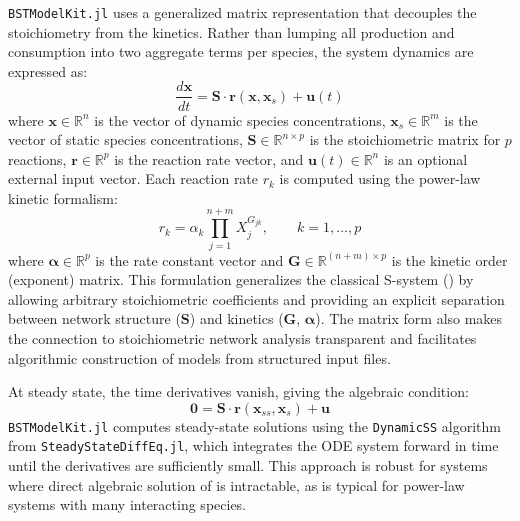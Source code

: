 \documentclass[11pt]{article}
\begin{document}
\texttt{BSTModelKit.jl} uses a generalized matrix representation that decouples the stoichiometry from the kinetics. Rather than lumping all production and consumption into two aggregate terms per species, the system dynamics are expressed as:
\begin{equation}\label{eq:matrix}
    \frac{d\mathbf{x}}{dt} = \mathbf{S} \cdot \mathbf{r}(\mathbf{x}, \mathbf{x}_s) + \mathbf{u}(t)
\end{equation}
where $\mathbf{x} \in \mathbb{R}^n$ is the vector of dynamic species concentrations, $\mathbf{x}_s \in \mathbb{R}^m$ is the vector of static species concentrations, $\mathbf{S} \in \mathbb{R}^{n \times p}$ is the stoichiometric matrix for $p$ reactions, $\mathbf{r} \in \mathbb{R}^p$ is the reaction rate vector, and $\mathbf{u}(t) \in \mathbb{R}^n$ is an optional external input vector. Each reaction rate $r_k$ is computed using the power-law kinetic formalism:
\begin{equation}\label{eq:powerlaw}
    r_k = \alpha_k \prod_{j=1}^{n+m} X_j^{G_{jk}}, \qquad k = 1, \dots, p
\end{equation}
where $\boldsymbol{\alpha} \in \mathbb{R}^p$ is the rate constant vector and $\mathbf{G} \in \mathbb{R}^{(n+m) \times p}$ is the kinetic order (exponent) matrix. This formulation generalizes the classical S-system () by allowing arbitrary stoichiometric coefficients and providing an explicit separation between network structure ($\mathbf{S}$) and kinetics ($\mathbf{G}$, $\boldsymbol{\alpha}$). The matrix form also makes the connection to stoichiometric network analysis transparent and facilitates algorithmic construction of models from structured input files.

At steady state, the time derivatives vanish, giving the algebraic condition:
\begin{equation}\label{eq:steadystate}
    \mathbf{0} = \mathbf{S} \cdot \mathbf{r}(\mathbf{x}_{ss}, \mathbf{x}_s) + \mathbf{u}
\end{equation}
\texttt{BSTModelKit.jl} computes steady-state solutions using the \texttt{DynamicSS} algorithm from \texttt{Steady\-State\-Diff\-Eq.jl}, which integrates the ODE system forward in time until the derivatives are sufficiently small. This approach is robust for systems where direct algebraic solution of  is intractable, as is typical for power-law systems with many interacting species.
\end{document}
